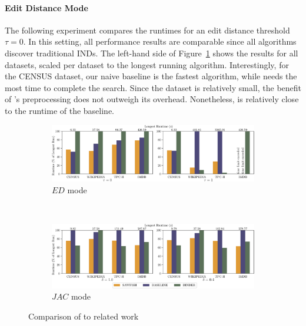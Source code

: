 \paragraph{Edit Distance Mode}
The following experiment compares the runtimes for an edit distance threshold $\tau = 0$. In this setting, all performance results are comparable since all algorithms discover traditional INDs.
The left-hand side of Figure~\ref{fig:eval:comparsion_ed} shows the results for all datasets, scaled per dataset to the longest running algorithm.
Interestingly, for the CENSUS dataset, our naive baseline is the fastest algorithm, while  needs the most time to complete the search.
Since the dataset is relatively small, the benefit of \sawfish's preprocessing does not outweigh its overhead.
Nonetheless, \sawfish is relatively close to the runtime of the baseline.

\begin{figure}[ht]
    \centering
    \begin{subfigure}[b]{\textwidth}
        \centering
        \includegraphics[width=\textwidth]{figures/competitor_bars.pdf}
        \caption{$ED$ mode}
        \label{fig:eval:comparsion_ed}
    \end{subfigure}\\
    \begin{subfigure}[b]{\textwidth}
        \centering
        \includegraphics[width=\textwidth]{figures/competitor_bars_token.pdf}
        \caption{$JAC$ mode}
        \label{fig:eval:comparison_jac}
    \end{subfigure}
    \caption{Comparison of \sawfish to related work}
\end{figure}

